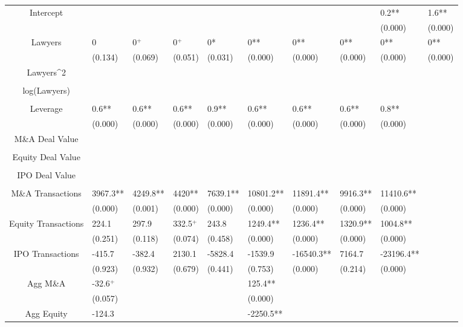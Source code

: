 \documentclass{article}
\begin{document}
\begin{table}[H]
\begin{tabular}{|clllllllll|}
Intercept &  &  &  &  &  &  &  & 0.2** & 1.6** \\ 
   &  &  &  &  &  &  &  & (0.000) & (0.000) \\ 
  Lawyers & 0 & 0$^{+}$ & 0$^{+}$ & 0* & 0** & 0** & 0** & 0** & 0** \\ 
   & (0.134) & (0.069) & (0.051) & (0.031) & (0.000) & (0.000) & (0.000) & (0.000) & (0.000) \\ 
  Lawyers^2 &  &  &  &  &  &  &  &  &  \\ 
   &  &  &  &  &  &  &  &  &  \\ 
  log(Lawyers) &  &  &  &  &  &  &  &  &  \\ 
   &  &  &  &  &  &  &  &  &  \\ 
  Leverage & 0.6** & 0.6** & 0.6** & 0.9** & 0.6** & 0.6** & 0.6** & 0.8** &  \\ 
   & (0.000) & (0.000) & (0.000) & (0.000) & (0.000) & (0.000) & (0.000) & (0.000) &  \\ 
  M\&A Deal Value &  &  &  &  &  &  &  &  &  \\ 
   &  &  &  &  &  &  &  &  &  \\ 
  Equity Deal Value &  &  &  &  &  &  &  &  &  \\ 
   &  &  &  &  &  &  &  &  &  \\ 
  IPO Deal Value &  &  &  &  &  &  &  &  &  \\ 
   &  &  &  &  &  &  &  &  &  \\ 
  M\&A Transactions & 3967.3** & 4249.8** & 4420** & 7639.1** & 10801.2** & 11891.4** & 9916.3** & 11410.6** &  \\ 
   & (0.000) & (0.001) & (0.000) & (0.000) & (0.000) & (0.000) & (0.000) & (0.000) &  \\ 
  Equity Transactions & 224.1 & 297.9 & 332.5$^{+}$ & 243.8 & 1249.4** & 1236.4** & 1320.9** & 1004.8** &  \\ 
   & (0.251) & (0.118) & (0.074) & (0.458) & (0.000) & (0.000) & (0.000) & (0.000) &  \\ 
  IPO Transactions & -415.7 & -382.4 & 2130.1 & -5828.4 & -1539.9 & -16540.3** & 7164.7 & -23196.4** &  \\ 
   & (0.923) & (0.932) & (0.679) & (0.441) & (0.753) & (0.000) & (0.214) & (0.000) &  \\ 
  Agg M\&A & -32.6$^{+}$ &  &  &  & 125.4** &  &  &  &  \\ 
   & (0.057) &  &  &  & (0.000) &  &  &  &  \\ 
  Agg Equity & -124.3 &  &  &  & -2250.5** &  &  &  &  \\ 

\end{tabular}
\end{table}
\end{document}
